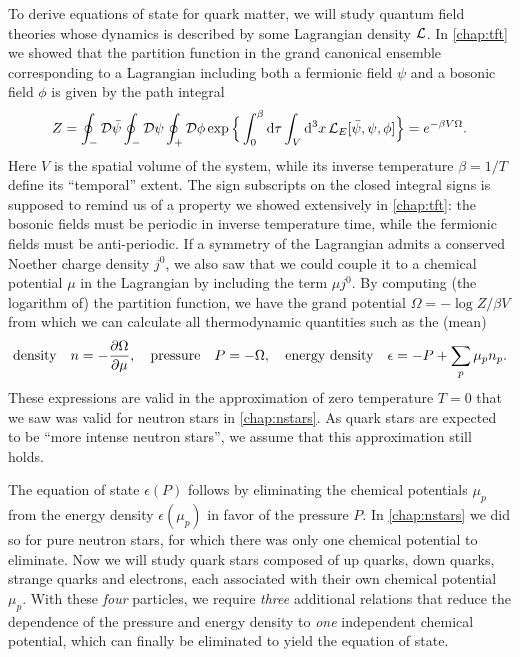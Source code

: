To derive equations of state for quark matter, we will study quantum field theories whose dynamics is described by some Lagrangian density $\mathcal{L}$.
In \cref{chap:tft} we showed that the partition function in the grand canonical ensemble corresponding to a Lagrangian including both a fermionic field $\psi$ and a bosonic field $\phi$ is given by the path integral
\begin{equation}
	Z = \oint_- \mathcal{D} \bar{\psi} \oint_- \mathcal{D} \psi \oint_+ \mathcal{D} \phi \exp \Big\{ \int_0^\beta \mathop{}\!\mathrm{d} \tau \int_V \mathop{}\!\mathrm{d}^3 x \, \mathcal{L}_E[\bar{\psi}, \psi, \phi] \Big\} = e^{-\beta V \Omega} .
\end{equation}
Here $V$ is the spatial volume of the system, while its inverse temperature $\beta = 1/T$ define its ``temporal'' extent.
The sign subscripts on the closed integral signs is supposed to remind us of a property we showed extensively in \cref{chap:tft}: the bosonic fields must be periodic in inverse temperature time, while the fermionic fields must be anti-periodic.
If a symmetry of the Lagrangian admits a conserved Noether charge density $j^0$, we also saw that we could couple it to a chemical potential $\mu$ in the Lagrangian by including the term $\mu j^0$.
By computing (the logarithm of) the partition function, we have the grand potential $\Omega = -\log Z / \beta V$ from which we can calculate all thermodynamic quantities such as the (mean)
\begin{equation}
	\text{density} \quad n = -\pdv{\Omega}{\mu}, \quad
	\text{pressure} \quad P = -\Omega, \quad
	\text{energy density} \quad \epsilon = -P + \sum_p \mu_p n_p .
\end{equation}
These expressions are valid in the approximation of zero temperature $T=0$ that we saw was valid for neutron stars in \cref{chap:nstars}.
As quark stars are expected to be ``more intense neutron stars'', we assume that this approximation still holds.

The equation of state $\epsilon(P)$ follows by eliminating the chemical potentials $\mu_p$ from the energy density $\epsilon(\mu_p)$ in favor of the pressure $P$.
In \cref{chap:nstars} we did so for pure neutron stars, for which there was only one chemical potential to eliminate.
Now we will study quark stars composed of up quarks, down quarks, strange quarks and electrons, each associated with their own chemical potential $\mu_p$.
With these \emph{four} particles, we require \emph{three} additional relations that reduce the dependence of the pressure and energy density to \emph{one} independent chemical potential, which can finally be eliminated to yield the equation of state.


